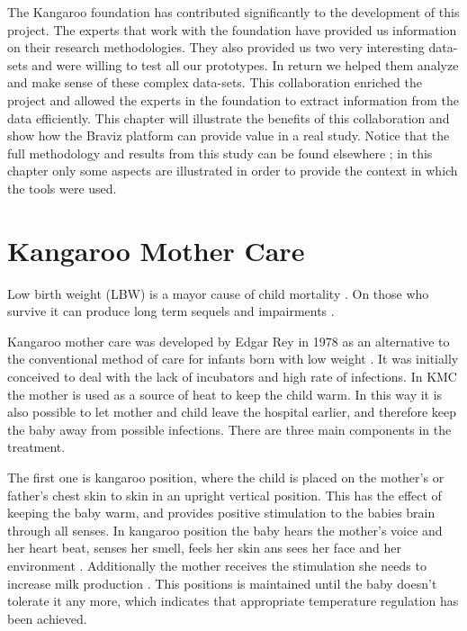 \label{chap_kmc400}



The Kangaroo foundation has contributed significantly to the development of this project. The experts that work with the foundation have provided us information on their research methodologies. They also provided us two very interesting data-sets and were willing to test all our prototypes. In return we helped them analyze and make sense of these complex data-sets. This collaboration enriched the project and allowed the experts in the foundation to extract information from the data efficiently. This chapter will illustrate the benefits of this collaboration and show how the Braviz platform can provide value in a real study. Notice that the full methodology and results from this study can be found elsewhere \autocite{charpak_final_2015}; in this chapter only some aspects are illustrated in order to provide the context in which the tools were used.

\section{Kangaroo Mother Care}

Low birth weight (LBW) is a mayor cause of child mortality \autocite{wardlaw_low_2005}. On those who survive it can produce long term sequels and impairments \autocite{nosarti_neurodevelopmental_2010}. 

Kangaroo mother care was developed by Edgar Rey in 1978 \autocite{rey_rational_1983} as an alternative to the conventional method of care for infants born with low weight \autocite{conde-agudelo_kangaroo_2003}. It was initially conceived to deal with the lack of incubators and high rate of infections. In KMC the mother is used as a source of heat to keep the child warm. In this way it is also possible to let mother and child leave the hospital earlier, and therefore keep the baby away from possible infections. There are three main components in the treatment.

The first one is kangaroo position, where the child is placed on the mother's or father's chest skin to skin in an upright vertical position. This has the effect  of keeping the baby warm, and provides positive stimulation to the babies brain through all senses. In kangaroo position the baby hears the mother's voice and her heart beat, senses her smell, feels her skin ans sees her face and her environment \autocite{tessier_kangaroo_2003}. Additionally the mother receives the stimulation she needs to increase milk production \autocite{charpak_kangaroo_2005}. This positions is maintained until the baby doesn't tolerate it any more, which indicates that appropriate temperature regulation has been achieved. 

